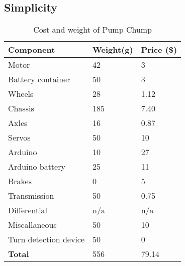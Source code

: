 \documentclass[class=../../report, crop=false]{standalone}
\newcommand{\weight}[1]{
	\cellcolor{blue!10}#1
}
\newcommand{\cost}[1]{
	\cellcolor{green!10}#1
}
\newcommand{\total}[1]{
	\cellcolor{green!25}#1
}
\begin{document}
\subsection{Simplicity}
\begin{table}[H]
	\centering
	\begin{tabular}{| l | l | l|}
		\hline
		\textbf{Component} & \textbf{Weight(g)} & \textbf{Price (\$)}\\ \hline
		Motor					& \weight{42}	& \cost{3}		\\ \hline
		Battery container		& \weight{50}	& \cost{3}		\\ \hline
		Wheels					& \weight{28}	& \cost{1.12}	\\ \hline
		Chassis					& \weight{185}	& \cost{7.40}	\\ \hline
		Axles					& \weight{16}	& \cost{0.87}	\\ \hline
		Servos					& \weight{50}	& \cost{10}		\\ \hline
		Arduino					& \weight{10}	& \cost{27}		\\ \hline
		Arduino battery			& \weight{25}	& \cost{11}		\\ \hline
		Brakes					& \weight{0}	& \cost{5}		\\ \hline
		Transmission			& \weight{50}	& \cost{0.75}	\\ \hline
		Differential			& \weight{n/a}	& \cost{n/a}	\\ \hline
		Miscallaneous			& \weight{50}	& \cost{10}		\\ \hline
		Turn detection device	& \weight{50}	& \cost{0}		\\ \hline
		\total{\textbf{Total}} 	& \total{556}	& \total{79.14}	\\ \hline
	\end{tabular}
	\caption{Cost and weight of Pump Chump}
\end{table}
\end{document}
